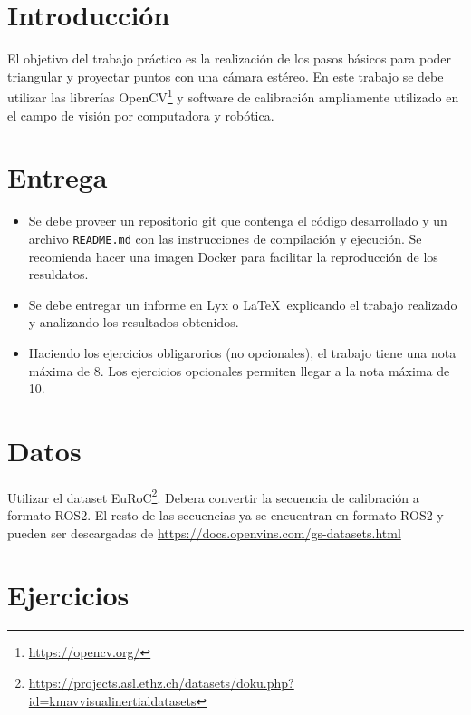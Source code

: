 \documentclass[tp]{lcc}
\begin{document}
\maketitle

\section{Introducción}

El objetivo del trabajo práctico es la realización de los pasos básicos para poder triangular y proyectar puntos con una cámara estéreo. En este trabajo se debe utilizar  las librerías OpenCV\footnote{\url{https://opencv.org/}} y software de calibración ampliamente utilizado en el campo de visión por computadora y robótica.


\section{Entrega}
\begin{itemize}
	\item Se debe proveer un repositorio git que contenga el código desarrollado y un archivo \lstinline{README.md} con las instrucciones de compilación y ejecución. Se recomienda hacer una imagen Docker para facilitar la reproducción de los resuldatos.
    
	\item Se debe entregar un informe en Lyx o \LaTeX\  explicando el trabajo realizado y analizando los resultados obtenidos.
	
    \item Haciendo los ejercicios obligarorios (no opcionales), el trabajo tiene una nota máxima de 8. Los ejercicios opcionales permiten llegar a la nota máxima de 10.
\end{itemize}

\section{Datos}
Utilizar el dataset EuRoC\footnote{\url{https://projects.asl.ethz.ch/datasets/doku.php?id=kmavvisualinertialdatasets}}. Debera convertir la secuencia de calibración a formato ROS2. El resto de las secuencias ya se encuentran en formato ROS2 y pueden ser descargadas de \url{https://docs.openvins.com/gs-datasets.html}


\section{Ejercicios}
\end{document}
